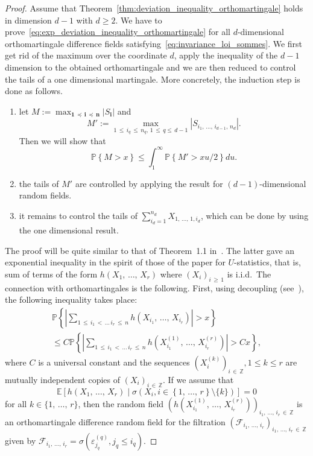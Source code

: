 \documentclass[10pt]{amsart}
\theoremstyle{definition}\newtheorem{defi}[theo]{Definition}\newtheorem{rema}[theo]{Remark}\newtheorem{exam}[theo]{Example}\newtheorem{exem}[theo]{Example}\newtheorem{nota}[theo]{Notation}
\newcommand{\Fca}{\mathcal{F}}
\newcommand\PP{\mathbb{P}}
\newcommand\Z{\mathbb{Z}}
\newcommand{\bbE}{\mathbb{E}}
\newcommand\ens[1]{\{ #1\}}
\newcommand\abs[1]{|#1|}
\newcommand{\pr}[1]{(#1)}
\newcommand\eps{\varepsilon}
\newcommand{\gr}[1]{\bm{#1}}
\newcommand{\gri}{\bm{i}}
\newcommand{\imd}{\preccurlyeq}
\newcommand*{\stepenumi}{\renewcommand*{\theenumi}{Step~\arabic{enumi}}}
\begin{document}
\begin{proof}
Assume that Theorem~\ref{thm:deviation_inequality_orthomartingale} holds in dimension $d-1$ with $d\geq 2$. We have to prove~\eqref{eq:exp_deviation_inequality_orthomartingale} for all $d$-dimensional orthomartingale difference fields satisfying~\eqref{eq:invariance_loi_sommes}. We first get rid of the maximum over the coordinate $d$, apply the inequality of the $d-1$ dimension to the obtained orthomartingale and we are then reduced to control the tails of a one dimensional martingale. More concretely, the induction step is done as follows.
\begin{enumerate}\stepenumi
\item\label{step1} let $M:=\max_{\gr{1}\,\imd\,\gri\,\imd\,\gr{n} } \abs{S_{\gri} }$ and
\begin{equation}
M':=\max_{1\,\leq\,i_q\,\leq\,n_q,\,1\,\leq\,q\leq\,d-1}
\left|S_{i_1,\,\dots,\,i_{d-1},\,n_d}\right|.
\end{equation}
Then we will show that
\begin{equation}
\PP\left\{M>x\right\}\leq \int_1^\infty\PP\left\{M'>xu/2\right\}du.
\end{equation}
\item\label{step2} the tails of $M'$ are controlled by applying the result for $\pr{d-1}$-dimensional random fields.
\item\label{step3} it remains to control the tails of $\sum_{i_d=1}^{n_d}X_{1,\,\dots,\,1,i_d}$, which can be done by using the one dimensional result.
\end{enumerate}


The proof will be quite similar to that of Theorem~1.1 in~\cite{MR4466386}. The latter gave an exponential inequality in the spirit of those of the paper for $U$-statistics, that is, sum of terms of the form $h\pr{X_1,\,\dots,\,X_r}$ where $\pr{X_i}_{i\,\geq\,1}$ is i.i.d.\ The connection with orthomartingales is the following. First, using decoupling (see~\cite{MR1334173}), the following inequality takes place:
\begin{multline}
\PP\left\{\left|\sum_{1\,\leq\,i_1\,<\,\dots\,i_r\,\leq\,n} h\left(X_{i_1},\,\dots,\,X_{i_r}\right) \right|>x\right\}\\
\leq C\PP\left\{\left|\sum_{1\,\leq\, i_1\,<\,\dots\,i_r\,\leq\,n} h\left(X_{i_1}^{\pr{1}},\,\dots,\,X_{i_r}^{\pr{r}}\right) \right|>Cx\right\},
\end{multline}
where $C$ is a universal constant and the sequences $\pr{X_i^{\pr{k}}}_{i\,\in\,\Z}, 1\leq k\leq r$ are mutually independent copies of $\pr{X_i}_{i\,\in\,\Z}$. If we assume that
\[
\bbE\left[h\left(X_1,\,\dots,\,X_r\right)\mid \sigma\left(X_i, i\in\left\{1,\,\dots,\,r\right\}\setminus \ens{k}\right)\right]=0
\]
for all $k\in \ens{1,\,\dots,\,r}$, then the random field $\pr{ h\pr{X_{i_1}^{\pr{1}},\,\dots,\,X_{i_r}^{\pr{r}}}}_{ i_1,\,\dots,\,i_r\,\in\,\Z}$ is an orthomartingale difference random field for the filtration $\pr{\Fca_{i_1,\,\dots,\,i_r}}_{i_1,\,\dots,\,i_r\,\in\,\Z}$ given by $\Fca_{i_1,\,\dots,\,i_r}=\sigma\pr{\eps_{j_q}^{\pr{q}}, j_q\leq i_q}$.


\end{proof}
\end{document}
